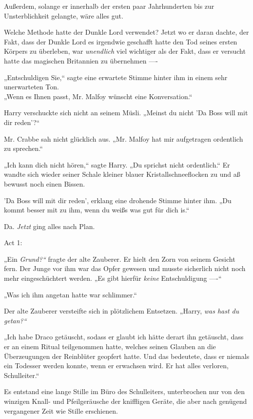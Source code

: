 {Außerdem, solange er innerhalb der ersten paar Jahrhunderten bis zur Unsterblichkeit gelangte, wäre alles gut.

Welche Methode hatte der Dunkle Lord verwendet? Jetzt wo er daran dachte, der Fakt, dass der Dunkle Lord es irgendwie geschafft hatte den Tod seines ersten Körpers zu überleben, war \emph{unendlich} viel wichtiger als der Fakt, dass er versucht hatte das magischen Britannien zu übernehmen ----

„Entschuldigen Sie,“ sagte eine erwartete Stimme hinter ihm in einem sehr unerwarteten Ton.\\ „Wenn es Ihnen passt, Mr. Malfoy wünscht eine Konversation.“

Harry verschuckte sich nicht an seinem Müsli. „Meinst du nicht 'Da Boss will mit dir reden'?“

Mr. Crabbe sah nicht glücklich aus. „Mr. Malfoy hat mir aufgetragen ordentlich zu sprechen.“

„Ich kann dich nicht hören,“ sagte Harry. „Du sprichst nicht ordentlich.“ Er wandte sich wieder seiner Schale kleiner blauer Kristallschneeflocken zu und aß bewusst noch einen Bissen.

'Da Boss will mit dir reden', erklang eine drohende Stimme hinter ihm. „Du kommt besser mit zu ihm, wenn du weißs was gut für dich is.“

Da. \emph{Jetzt} ging alles nach Plan.

Act 1:

„Ein \emph{Grund?“} fragte der alte Zauberer. Er hielt den Zorn von seinem Gesicht fern. Der Junge vor ihm war das Opfer gewesen und musste sicherlich nicht noch mehr eingeschüchtert werden. „Es gibt hierfür \emph{keine} Entschuldigung ----“

„Was ich ihm angetan hatte war schlimmer.“

Der alte Zauberer versteifte sich in plötzlichem Entsetzen. „Harry, \emph{was hast du getan?“}

„Ich habe Draco getäuscht, sodass er glaubt ich hätte derart ihn getäuscht, dass er an einem Ritual teilgenommen hatte, welches seinen Glauben an die Überzeugungen der Reinblüter geopfert hatte. Und das bedeutete, dass er niemals ein Todesser werden konnte, wenn er erwachsen wird. Er hat alles verloren, Schulleiter.“

Es entstand eine lange Stille im Büro des Schulleiters, unterbrochen nur von den winzigen Knall- und Pfeilgeräusche der kniffligen Geräte, die aber nach genügend vergangener Zeit wie Stille erschienen.

}
